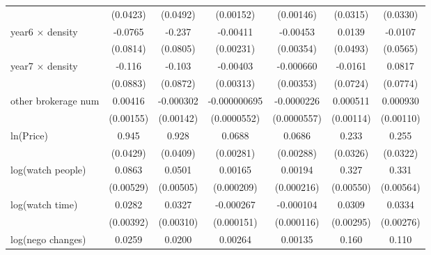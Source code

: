 {\begin{tabular}{l*{6}{c}}
            &    (0.0423)         &    (0.0492)         &   (0.00152)         &   (0.00146)         &    (0.0315)         &    (0.0330)         \\
\addlinespace
year6 $\times$ density&     -0.0765         &      -0.237\sym{***}&    -0.00411\sym{*}  &    -0.00453         &      0.0139         &     -0.0107         \\
            &    (0.0814)         &    (0.0805)         &   (0.00231)         &   (0.00354)         &    (0.0493)         &    (0.0565)         \\
\addlinespace
year7 $\times$ density&      -0.116         &      -0.103         &    -0.00403         &   -0.000660         &     -0.0161         &      0.0817         \\
            &    (0.0883)         &    (0.0872)         &   (0.00313)         &   (0.00353)         &    (0.0724)         &    (0.0774)         \\
\addlinespace
other brokerage num  &     0.00416\sym{***}&   -0.000302         &-0.000000695         &  -0.0000226         &    0.000511         &    0.000930         \\
            &   (0.00155)         &   (0.00142)         & (0.0000552)         & (0.0000557)         &   (0.00114)         &   (0.00110)         \\
\addlinespace
ln(Price)&       0.945\sym{***}&       0.928\sym{***}&      0.0688\sym{***}&      0.0686\sym{***}&       0.233\sym{***}&       0.255\sym{***}\\
            &    (0.0429)         &    (0.0409)         &   (0.00281)         &   (0.00288)         &    (0.0326)         &    (0.0322)         \\
\addlinespace
log(watch people)&      0.0863\sym{***}&      0.0501\sym{***}&     0.00165\sym{***}&     0.00194\sym{***}&       0.327\sym{***}&       0.331\sym{***}\\
            &   (0.00529)         &   (0.00505)         &  (0.000209)         &  (0.000216)         &   (0.00550)         &   (0.00564)         \\
\addlinespace
log(watch time)&      0.0282\sym{***}&      0.0327\sym{***}&   -0.000267\sym{*}  &   -0.000104         &      0.0309\sym{***}&      0.0334\sym{***}\\
            &   (0.00392)         &   (0.00310)         &  (0.000151)         &  (0.000116)         &   (0.00295)         &   (0.00276)         \\
\addlinespace
log(nego changes)&      0.0259\sym{***}&      0.0200\sym{**} &     0.00264\sym{***}&     0.00135\sym{***}&       0.160\sym{***}&       0.110\sym{***}\\

\end{tabular}}
